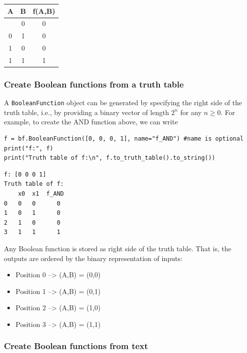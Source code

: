 \documentclass[
]{article}
\newcounter{none} %
\providecommand{\tightlist}{%
  \setlength{\itemsep}{0pt}\setlength{\parskip}{0pt}}
\begin{document}
{\def\LTcaptype{none} %
\begin{longtable}[]{@{}ccc@{}}
\toprule\noalign{}
A & B & f(A,B) \\
\midrule\noalign{}
\endhead
\bottomrule\noalign{}
\endlastfoot
0 & 0 & 0 \\
0 & 1 & 0 \\
1 & 0 & 0 \\
1 & 1 & 1 \\
\end{longtable}
}

\subsubsection{Create Boolean functions from a truth
table}\label{create-boolean-functions-from-a-truth-table}

A \texttt{BooleanFunction} object can be generated by specifying the
right side of the truth table, i.e., by providing a binary vector of
length \(2^n\) for any \(n\geq 0\). For example, to create the AND
function above, we can write

\begin{lstlisting}
f = bf.BooleanFunction([0, 0, 0, 1], name="f_AND") #name is optional
print("f:", f)
print("Truth table of f:\n", f.to_truth_table().to_string())
\end{lstlisting}

\begin{lstlisting}
f: [0 0 0 1]
Truth table of f:
    x0  x1  f_AND
0   0   0      0
1   0   1      0
2   1   0      0
3   1   1      1
\end{lstlisting}

Any Boolean function is stored as right side of the truth table. That
is, the outputs are ordered by the binary representation of inputs:

\begin{itemize}
\tightlist
\item
  Position 0 --\textgreater{} (A,B) = (0,0)
\item
  Position 1 --\textgreater{} (A,B) = (0,1)
\item
  Position 2 --\textgreater{} (A,B) = (1,0)
\item
  Position 3 --\textgreater{} (A,B) = (1,1)
\end{itemize}

\subsubsection{Create Boolean functions from
text}\label{create-boolean-functions-from-text}
\end{document}
